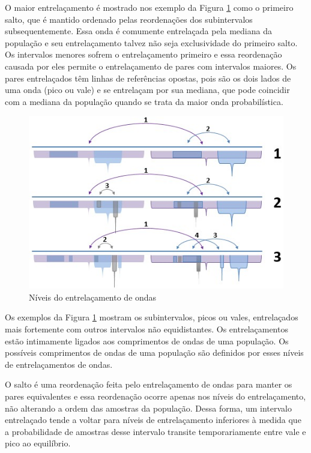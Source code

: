 O maior entrelaçamento é mostrado nos exemplo da Figura \ref{fig:consciousness_subconscious_entanglement} como o primeiro salto, que é mantido ordenado pelas reordenações dos subintervalos subsequentemente. Essa onda é comumente entrelaçada pela mediana da população e seu entrelaçamento talvez não seja exclusividade do primeiro salto. Os intervalos menores sofrem o entrelaçamento primeiro e essa reordenação causada por eles permite o entrelaçamento de pares com intervalos maiores. Os pares entrelaçados têm linhas de referências opostas, pois são os dois lados de uma onda (pico ou vale) e se entrelaçam por sua mediana, que pode coincidir com a mediana da população quando se trata da maior onda probabilística. 
	\begin{figure}[H]
	\caption{Níveis do entrelaçamento de ondas}
	\label{fig:consciousness_subconscious_entanglement}
	\centering
	\includegraphics[scale=.9]{sections/images/consciousness_subconscious_entanglement.jpg}
	\end{figure}

Os exemplos da Figura \ref{fig:consciousness_subconscious_entanglement} mostram os subintervalos, picos ou vales, entrelaçados mais fortemente com outros intervalos não equidistantes. Os entrelaçamentos estão intimamente ligados aos comprimentos de ondas de uma população. Os possíveis comprimentos de ondas de uma população são definidos por esses níveis de entrelaçamentos de ondas.

O salto é uma reordenação feita pelo entrelaçamento de ondas para manter os pares equivalentes e essa reordenação ocorre apenas nos níveis do entrelaçamento, não alterando a ordem das amostras da população. Dessa forma, um intervalo entrelaçado tende a voltar para níveis de entrelaçamento inferiores à medida que a probabilidade de amostras desse intervalo transite temporariamente entre vale e pico ao equilíbrio. 

